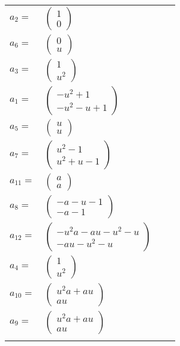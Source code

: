 \documentclass[1p]{elsarticle_modified}
\theoremstyle{definition}
\begin{document}
\begin{tabular}{m{7pt} m{180pt} m{7pt} m{180pt} }
\flushright $a_{2}=$&$\begin{pmatrix}1\\0\end{pmatrix}$ \\
\flushright $a_{6}=$&$\begin{pmatrix}0\\u\end{pmatrix}$ \\
\flushright $a_{3}=$&$\begin{pmatrix}1\\u^2\end{pmatrix}$ \\
\flushright $a_{1}=$&$\begin{pmatrix}- u^2+1\\- u^2- u+1\end{pmatrix}$ \\
\flushright $a_{5}=$&$\begin{pmatrix}u\\u\end{pmatrix}$ \\
\flushright $a_{7}=$&$\begin{pmatrix}u^2-1\\u^2+u-1\end{pmatrix}$ \\
\flushright $a_{11}=$&$\begin{pmatrix}a\\a\end{pmatrix}$ \\
\flushright $a_{8}=$&$\begin{pmatrix}- a- u-1\\- a-1\end{pmatrix}$ \\
\flushright $a_{12}=$&$\begin{pmatrix}- u^2 a- a u- u^2- u\\- a u- u^2- u\end{pmatrix}$ \\
\flushright $a_{4}=$&$\begin{pmatrix}1\\u^2\end{pmatrix}$ \\
\flushright $a_{10}=$&$\begin{pmatrix}u^2 a+a u\\a u\end{pmatrix}$ \\
\flushright $a_{9}=$&$\begin{pmatrix}u^2 a+a u\\a u\end{pmatrix}$\\&\end{tabular}
\end{document}
